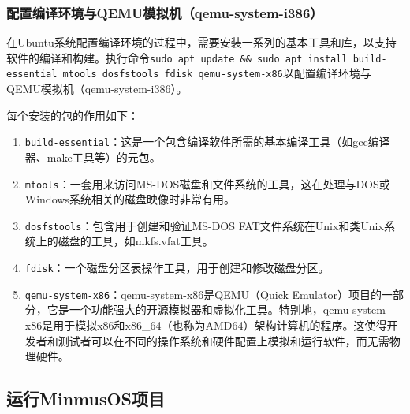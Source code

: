 \subsubsection{配置编译环境与QEMU模拟机（qemu-system-i386）}

在Ubuntu系统配置编译环境的过程中，需要安装一系列的基本工具和库，以支持软件的编译和构建。执行命令\texttt{sudo apt update \&\& sudo apt install build-essential mtools dosfstools fdisk qemu-system-x86}以配置编译环境与QEMU模拟机（qemu-system-i386）。

每个安装的包的作用如下：

\begin{enumerate}
    \item \texttt{build-essential}：这是一个包含编译软件所需的基本编译工具（如gcc编译器、make工具等）的元包。
    \item \texttt{mtools}：一套用来访问MS-DOS磁盘和文件系统的工具，这在处理与DOS或Windows系统相关的磁盘映像时非常有用。
    \item \texttt{dosfstools}：包含用于创建和验证MS-DOS FAT文件系统在Unix和类Unix系统上的磁盘的工具，如mkfs.vfat工具。
    \item \texttt{fdisk}：一个磁盘分区表操作工具，用于创建和修改磁盘分区。
    \item \texttt{qemu-system-x86}：qemu-system-x86是QEMU（Quick Emulator）项目的一部分，它是一个功能强大的开源模拟器和虚拟化工具。特别地，qemu-system-x86是用于模拟x86和x86\_64（也称为AMD64）架构计算机的程序。这使得开发者和测试者可以在不同的操作系统和硬件配置上模拟和运行软件，而无需物理硬件。
\end{enumerate}

\subsection{运行MinmusOS项目}